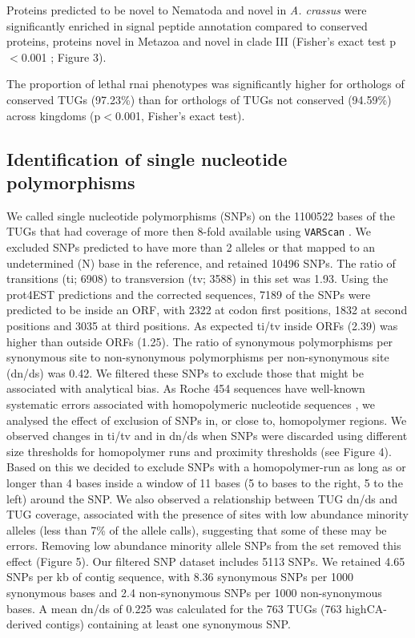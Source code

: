 \documentclass[10pt]{bmc_article}
\newenvironment{bmcformat}{\begin{raggedright}\baselineskip20pt\sloppy\setboolean{publ}{false}}{\end{raggedright}\baselineskip20pt\sloppy}
\begin{document}
\begin{bmcformat}
Proteins predicted to be novel to Nematoda and novel in
\textit{A. crassus} were significantly enriched in signal peptide
annotation compared to conserved proteins, proteins novel in Metazoa
and novel in clade III (Fisher's exact test p$<$0.001 ; Figure 3).

The proportion of lethal rnai phenotypes was significantly higher for
orthologs of conserved TUGs
(97.23\%) than for orthologs of
TUGs not conserved (94.59\%) across
kingdoms (p$<$0.001, Fisher's exact test).

\subsection*{Identification of single nucleotide polymorphisms}

We called single nucleotide polymorphisms (SNPs) on the
1100522 bases of the TUGs that had coverage of more then
8-fold available using \texttt{VARScan} \cite{pmid19542151}. We
excluded SNPs predicted to have more than 2 alleles or that mapped to
an undetermined (N) base in the reference, and retained
10496 SNPs. The ratio of transitions (ti;
6908) to transversion (tv;
3588) in this set was
1.93. Using the prot4EST
predictions and the corrected sequences, 7189 of
the SNPs were predicted to be inside an ORF, with
2322 at codon first positions,
1832 at second positions and 3035
at third positions. As expected ti/tv inside ORFs
(2.39) was higher than outside ORFs
(1.25). The ratio of synonymous polymorphisms per
synonymous site to non-synonymous polymorphisms per non-synonymous
site (dn/ds) was 0.42. We filtered these SNPs to exclude
those that might be associated with analytical bias. As Roche 454
sequences have well-known systematic errors associated with
homopolymeric nucleotide sequences \cite{pmid21685085}, we analysed
the effect of exclusion of SNPs in, or close to, homopolymer
regions. We observed changes in ti/tv and in dn/ds when SNPs were
discarded using different size thresholds for homopolymer runs and
proximity thresholds (see Figure 4). Based on this we decided to
exclude SNPs with a homopolymer-run as long as or longer than 4 bases
inside a window of 11 bases (5 to bases to the right, 5 to the left)
around the SNP. We also observed a relationship between TUG dn/ds and
TUG coverage, associated with the presence of sites with low abundance
minority alleles (less than 7\% of the allele calls), suggesting that
some of these may be errors. Removing low abundance minority allele
SNPs from the set removed this effect (Figure 5).  Our filtered SNP
dataset includes 5113 SNPs. We retained
4.65 SNPs per kb of contig sequence, with
8.36 synonymous SNPs per 1000 synonymous bases and
2.4 non-synonymous SNPs per 1000 non-synonymous
bases. A mean dn/ds of 0.225 was
calculated for the 763 TUGs
(763 highCA-derived contigs)
containing at least one synonymous SNP.


\end{bmcformat}
\end{document}
